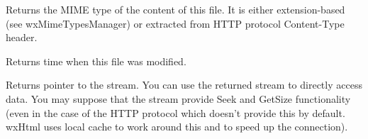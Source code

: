 \label{wxfsfilegetmimetype}


Returns the MIME type of the content of this file. It is either
extension-based (see wxMimeTypesManager) or extracted from
HTTP protocol Content-Type header.

\label{wxfsfilegetmodificationtime}


Returns time when this file was modified.

\label{wxfsfilegetstream}


Returns pointer to the stream. You can use the returned
stream to directly access data. You may suppose
that the stream provide Seek and GetSize functionality
(even in the case of the HTTP protocol which doesn't provide
this by default. wxHtml uses local cache to work around
this and to speed up the connection).

